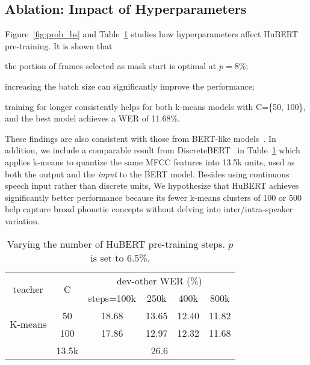 \subsection{Ablation: Impact of Hyperparameters}
Figure~\ref{fig:prob_bs} and Table~\ref{tab:step} studies how hyperparameters affect HuBERT pre-training.
It is shown that
\begin{enumerate*}[label=(\arabic*)]
    \item the portion of frames selected as mask start is optimal at $p=$8\%;
    \item increasing the batch size can significantly improve the performance; %
    \item training for longer consistently helps for both k-means models with C=\{50, 100\}, and the best model achieves a WER of 11.68\%.
\end{enumerate*}
These findings are also consistent with those from BERT-like models~\cite{clark2020electra}. In addition, we include a comparable result from DiscreteBERT~\cite{baevski2019effectiveness} in Table~\ref{tab:step} which applies k-means to quantize the same MFCC features into 13.5k units, used as both the output and the \textit{input} to the BERT model. Besides using continuous speech input rather than discrete units, We hypothesize that HuBERT achieves significantly better performance because its fewer k-means clusters of 100 or 500 help capture broad phonetic concepts without delving into inter/intra-speaker variation. 

\begin{table}[ht]
    \centering
\begin{tabular}{cc|cccc}
    \toprule
    \multirow{2}{*}{teacher} & \multirow{2}{*}{C} &  
    \multicolumn{4}{c}{dev-other WER (\%)} \\
    & & steps=100k & 250k & 400k & 800k \\
    \midrule
    \multirow{2}{*}{K-means}  
    & 50  & 18.68 & 13.65 & 12.40 & 11.82 \\
    & 100 & 17.86 & 12.97 & 12.32 & 11.68 \\
    \midrule
    \cite{baevski2019effectiveness} & 13.5k & \multicolumn{4}{c}{26.6} \\
    \bottomrule
\end{tabular}    \caption{Varying the number of HuBERT pre-training steps. $p$ is set to 6.5\%.}
    \label{tab:step}
\end{table}

